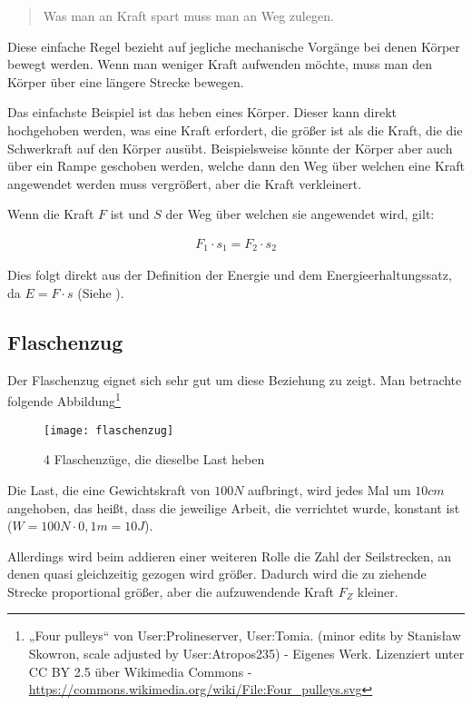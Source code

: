 \begin{quote}
	\glqq Was man an Kraft spart muss man an Weg zulegen.\grqq
\end{quote}

\noindent Diese einfache Regel bezieht auf jegliche mechanische Vorgänge bei denen Körper bewegt werden. Wenn man weniger Kraft aufwenden möchte, muss man den Körper über eine längere Strecke bewegen. 

Das einfachste Beispiel ist das heben eines Körper. Dieser kann direkt hochgehoben werden, was eine Kraft erfordert, die größer ist als die Kraft, die die Schwerkraft auf den Körper ausübt. Beispielsweise könnte der Körper aber auch über ein Rampe geschoben werden, welche dann den Weg über welchen eine Kraft angewendet werden muss vergrößert, aber die Kraft verkleinert. 

Wenn die Kraft $F$ ist und $S$ der Weg über welchen sie angewendet wird, gilt:

\begin{align}
	F_{1} \cdot s_1 = F_{2} \cdot s_2
\end{align}

\noindent Dies folgt direkt aus der Definition der Energie und dem Energieerhaltungssatz, da $E=F \cdot s$ (Siehe ).

\subsection{Flaschenzug}

Der Flaschenzug eignet sich sehr gut um diese Beziehung zu zeigt. Man betrachte folgende Abbildung\footnote{„Four pulleys“ von User:Prolineserver, User:Tomia. (minor edits by Stanisław Skowron, scale adjusted by User:Atropos235) - Eigenes Werk. Lizenziert unter CC BY 2.5 über Wikimedia Commons - \url{https://commons.wikimedia.org/wiki/File:Four_pulleys.svg}}

\begin{figure}[h!]
	\texttt{[image: flaschenzug]}
	\caption{4 Flaschenzüge, die dieselbe Last heben}
	\label{fig:flaschenzug}
\end{figure}

Die Last, die eine Gewichtskraft von $100N$ aufbringt, wird jedes Mal um $10cm$ angehoben, das heißt, dass die jeweilige Arbeit, die verrichtet wurde, konstant ist ($W = 100N \cdot 0,1m = 10J$).

Allerdings wird beim addieren einer weiteren Rolle die Zahl der Seilstrecken, an denen quasi gleichzeitig gezogen wird größer. Dadurch wird die zu ziehende Strecke proportional größer, aber die aufzuwendende Kraft $F_Z$ kleiner.

